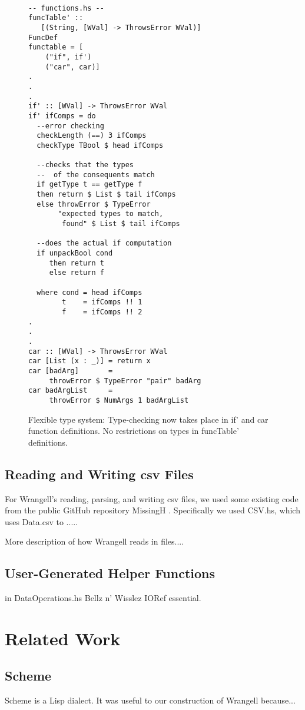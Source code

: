 \documentclass[preprint,nocopyrightspace]{sig-alternate}
\begin{document}
\begin{figure}
\caption{Flexible type system: Type-checking now takes place in if' and car function definitions. No restrictions on types in funcTable' definitions.}
\begin{lstlisting}

-- functions.hs --
funcTable' :: 
   [(String, [WVal] -> ThrowsError WVal)]
FuncDef
functable = [  
    ("if", if')
    ("car", car)]
.
.
.
if' :: [WVal] -> ThrowsError WVal 
if' ifComps = do
  --error checking
  checkLength (==) 3 ifComps
  checkType TBool $ head ifComps

  --checks that the types 
  --  of the consequents match
  if getType t == getType f
  then return $ List $ tail ifComps
  else throwError $ TypeError 
       "expected types to match, 
        found" $ List $ tail ifComps

  --does the actual if computation
  if unpackBool cond 
     then return t 
     else return f

  where cond = head ifComps
        t    = ifComps !! 1
        f    = ifComps !! 2
.
.
.
car :: [WVal] -> ThrowsError WVal
car [List (x : _)] = return x
car [badArg]       = 
     throwError $ TypeError "pair" badArg
car badArgList     = 
     throwError $ NumArgs 1 badArgList

\end{lstlisting} 
\label{fig:flexType}
\end{figure}

\subsection{Reading and Writing csv Files}
For Wrangell's reading, parsing, and writing csv files, we used some existing code from the public GitHub repository MissingH \cite{dataCSV}. Specifically we used CSV.hs, which uses Data.csv to .....

More description of how Wrangell reads in files....  

\subsection{User-Generated Helper Functions}
in DataOperations.hs
Bellz n' Wisslez
IORef essential. 

\section{Related Work}

\subsection{Scheme}
Scheme is a Lisp dialect. It was useful to our construction of Wrangell because...
\end{document}
